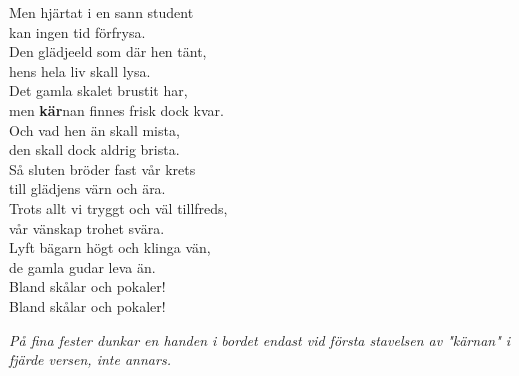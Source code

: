 \documentclass[a6paper,10pt]{article}
\begin{document}
\begin{lyrics}
\newpage
\setlength{\oddsidemargin}{-0.47in}
\noindent
Men hjärtat i en sann student\\
kan ingen tid förfrysa.\\
Den glädjeeld som där hen tänt,\\
hens hela liv skall lysa.\\
Det gamla skalet brustit har,\\
men \textbf{kär}nan finnes frisk dock kvar.\\
Och vad hen än skall mista,\\
den skall dock aldrig brista.
\vspace{5pt}\\
Så sluten bröder fast vår krets\\
till glädjens värn och ära.\\
Trots allt vi tryggt och väl tillfreds,\\
vår vänskap trohet svära.\\
Lyft bägarn högt och klinga vän,\\
de gamla gudar leva än.\\
Bland skålar och pokaler!\\
Bland skålar och pokaler! 
\begin{center}
\textit{På fina fester dunkar en handen i bordet endast vid första stavelsen av "kärnan" i fjärde versen, inte annars.}
\end{center}
\end{lyrics}
\end{document}

